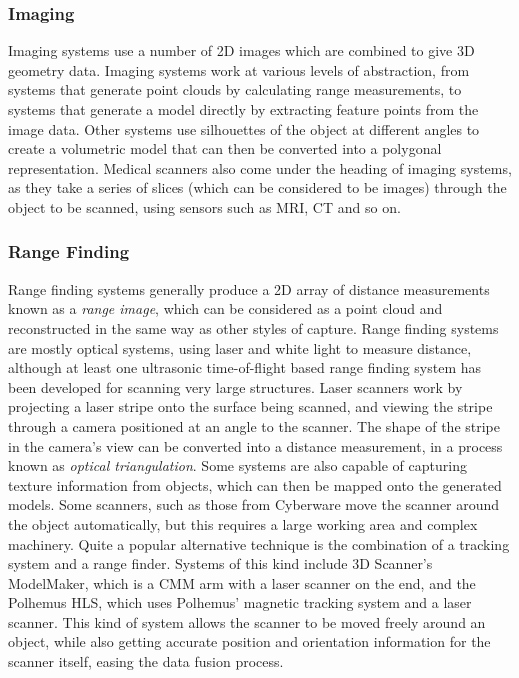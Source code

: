 \documentclass[10pt,oneside,fleqn,a4paper]{book}
\begin{document}
\subsubsection{Imaging}
Imaging systems use a number of 2D images which are combined to give 3D geometry data. Imaging systems work at various levels of abstraction, from systems that generate point clouds by calculating range measurements, to systems that generate a model directly by extracting feature points from the image data. Other systems use silhouettes of the object at different angles to create a volumetric model that can then be converted into a polygonal representation. Medical scanners also come under the heading of imaging systems, as they take a series of slices (which can be considered to be images) through the object to be scanned, using sensors such as MRI, CT and so on.

\subsubsection{Range Finding}
Range finding systems generally produce a 2D array of distance measurements known as a {\it range image}, which can be considered as a point cloud and reconstructed in the same way as other styles of capture. Range finding systems are mostly optical systems, using laser and white light to measure distance, although at least one ultrasonic time-of-flight based range finding system has been developed for scanning very large structures. Laser scanners work by projecting a laser stripe onto the surface being scanned, and viewing the stripe through a camera positioned at an angle to the scanner. The shape of the stripe in the camera's view can be converted into a distance measurement, in a process known as {\it optical triangulation}. Some systems are also capable of capturing texture information from objects, which can then be mapped onto the generated models. Some scanners, such as those from Cyberware move the scanner around the object automatically, but this requires a large working area and complex machinery. Quite a popular alternative technique is the combination of a tracking system and a range finder. Systems of this kind include 3D Scanner's ModelMaker, which is a CMM arm with a laser scanner on the end, and the Polhemus HLS, which uses Polhemus' magnetic tracking system and a laser scanner. This kind of system allows the scanner to be moved freely around an object, while also getting accurate position and orientation information for the scanner itself, easing the data fusion process.
\end{document}
